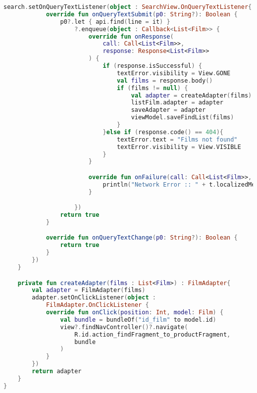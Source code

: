 \begin{lstlisting}[language=Kotlin, caption=\leftline{FindFragment}, label=lst:FindFragment]
        search.setOnQueryTextListener(object : SearchView.OnQueryTextListener{
            override fun onQueryTextSubmit(p0: String?): Boolean {
                p0?.let { api.find(line = it) }
                    ?.enqueue(object : Callback<List<Film>> {
                        override fun onResponse(
                            call: Call<List<Film>>,
                            response: Response<List<Film>>
                        ) {
                            if (response.isSuccessful) {
                                textError.visibility = View.GONE
                                val films = response.body()
                                if (films != null) {
                                    val adapter = createAdapter(films)
                                    listFilm.adapter = adapter
                                    saveAdapter = adapter
                                    viewModel.saveFindList(films)
                                }
                            }else if (response.code() == 404){
                                textError.text = "Films not found"
                                textError.visibility = View.VISIBLE
                            }
                        }

                        override fun onFailure(call: Call<List<Film>>, t: Throwable) {
                            println("Network Error :: " + t.localizedMessage);
                        }

                    })
                return true
            }

            override fun onQueryTextChange(p0: String?): Boolean {
                return true
            }
        })
    }

    private fun createAdapter(films : List<Film>) : FilmAdapter{
        val adapter = FilmAdapter(films)
        adapter.setOnClickListener(object :
            FilmAdapter.OnClickListener {
            override fun onClick(position: Int, model: Film) {
                val bundle = bundleOf("id_film" to model.id)
                view?.findNavController()?.navigate(
                    R.id.action_findFragment_to_productFragment,
                    bundle
                )
            }
        })
        return adapter
    }
}
\end{lstlisting}


